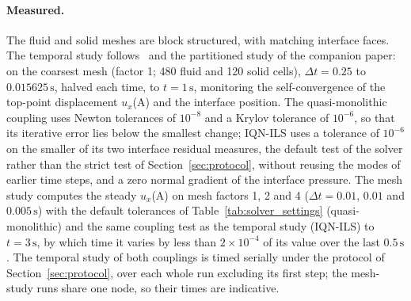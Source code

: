 \paragraph{Measured.}
The fluid and solid meshes are block structured, with matching interface faces.
The temporal study follows~\citet{Liu2014} and the partitioned study of the companion paper: on the coarsest mesh (factor 1; 480 fluid and 120 solid cells), $\Delta t = 0.25$ to $0.015625\,\mathrm{s}$, halved each time, to $t = 1\,\mathrm{s}$, monitoring the self-convergence of the top-point displacement $u_x$(A) and the interface position.
The quasi-monolithic coupling uses Newton tolerances of $10^{-8}$ and a Krylov tolerance of $10^{-6}$, so that its iterative error lies below the smallest change; IQN-ILS uses a tolerance of $10^{-6}$ on the smaller of its two interface residual measures, the default test of the solver rather than the strict test of Section~\ref{sec:protocol}, without reusing the modes of earlier time steps, and a zero normal gradient of the interface pressure.
The mesh study computes the steady $u_x$(A) on mesh factors 1, 2 and 4 ($\Delta t = 0.01$, $0.01$ and $0.005\,\mathrm{s}$) with the default tolerances of Table~\ref{tab:solver_settings} (quasi-monolithic) and the same coupling test as the temporal study (IQN-ILS) to $t = 3\,\mathrm{s}$, by which time it varies by less than $2\times10^{-4}$ of its value over the last $0.5\,\mathrm{s}$.
The temporal study of both couplings is timed serially under the protocol of Section~\ref{sec:protocol}, over each whole run excluding its first step; the mesh-study runs share one node, so their times are indicative.

